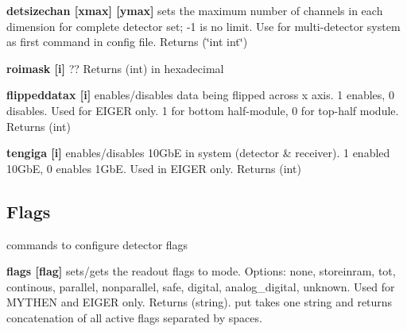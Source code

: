 \begin{DoxyItemize}
\item {\bfseries detsizechan \mbox{[}xmax\mbox{]} \mbox{[}ymax\mbox{]}} sets the maximum number of channels in each dimension for complete detector set; -\/1 is no limit. Use for multi-\/detector system as first command in config file. {\ttfamily Returns} {\ttfamily }(\char`\"{}int int\char`\"{})
\end{DoxyItemize}


\begin{DoxyItemize}
\item {\bfseries roimask \mbox{[}i\mbox{]}} ?? {\ttfamily Returns} {\ttfamily }(int) in hexadecimal
\end{DoxyItemize}


\begin{DoxyItemize}
\item {\bfseries flippeddatax \mbox{[}i\mbox{]}} enables/disables data being flipped across x axis. 1 enables, 0 disables. Used for EIGER only. 1 for bottom half-\/module, 0 for top-\/half module. {\ttfamily Returns} {\ttfamily }(int)
\end{DoxyItemize}


\begin{DoxyItemize}
\item {\bfseries tengiga \mbox{[}i\mbox{]}} enables/disables 10GbE in system (detector \& receiver). 1 enabled 10GbE, 0 enables 1GbE. Used in EIGER only. {\ttfamily Returns} {\ttfamily }(int)
\end{DoxyItemize}\hypertarget{config_configflags}{}\subsection{Flags}\label{config_configflags}
commands to configure detector flags


\begin{DoxyItemize}
\item {\bfseries flags \mbox{[}flag\mbox{]}} sets/gets the readout flags to mode. Options: none, storeinram, tot, continous, parallel, nonparallel, safe, digital, analog\_\-digital, unknown. Used for MYTHEN and EIGER only. {\ttfamily Returns} {\ttfamily }(string). put takes one string and {\ttfamily returns} concatenation of all active flags separated by spaces.
\end{DoxyItemize}


